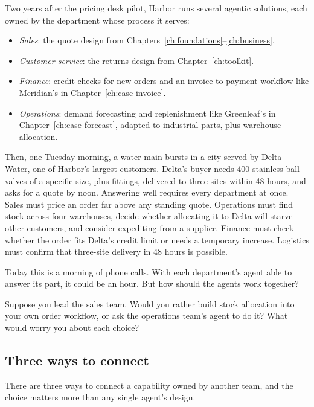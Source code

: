 Two years after the pricing desk pilot, Harbor runs several agentic solutions, each owned by the department whose process it serves:
\begin{itemize}[itemsep=1pt]
  \item \emph{Sales}: the quote design from Chapters~\ref{ch:foundations}--\ref{ch:business}.
  \item \emph{Customer service}: the returns design from Chapter~\ref{ch:toolkit}.
  \item \emph{Finance}: credit checks for new orders and an invoice-to-payment workflow like Meridian's in Chapter~\ref{ch:case-invoice}.
  \item \emph{Operations}: demand forecasting and replenishment like Greenleaf's in Chapter~\ref{ch:case-forecast}, adapted to industrial parts, plus warehouse allocation.
\end{itemize}

Then, one Tuesday morning, a water main bursts in a city served by Delta Water, one of Harbor's largest customers. Delta's buyer needs 400 stainless ball valves of a specific size, plus fittings, delivered to three sites within 48 hours, and asks for a quote by noon. Answering well requires every department at once. Sales must price an order far above any standing quote. Operations must find stock across four warehouses, decide whether allocating it to Delta will starve other customers, and consider expediting from a supplier. Finance must check whether the order fits Delta's credit limit or needs a temporary increase. Logistics must confirm that three-site delivery in 48 hours is possible.

Today this is a morning of phone calls. With each department's agent able to answer its part, it could be an hour. But how should the agents work together?

\begin{thinkabout}
Suppose you lead the sales team. Would you rather build stock allocation into your own order workflow, or ask the operations team's agent to do it? What would worry you about each choice?
\end{thinkabout}

\subsection{Three ways to connect}

There are three ways to connect a capability owned by another team, and the choice matters more than any single agent's design.

